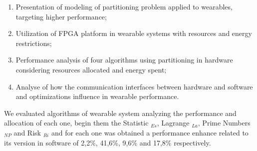     \begin{enumerate}
        \item 
        
        Presentation of modeling of partitioning problem applied to wearables, targeting higher performance;
        
        \item 
        Utilization of FPGA platform in wearable systems with resources and energy restrictions;
        
        
        \item %
        Performance analysis of four algorithms using partitioning in hardware considering resources allocated and energy spent;
        
        \item 
        Analyse of how the communication interfaces between hardware and software and optimizations influence in wearable performance.
        
    \end{enumerate}

    We evaluated algorithms of wearable system analyzing the performance and allocation of each one, begin them the Statistic \Ss$_{Es}$, Lagrange \Ss$_{La}$, Prime Numbers \Ss$_{NP}$ and Risk \Ss$_{Ri}$ and for each one was obtained a performance enhance related to its version in software of 2,2\%, 41,6\%, 9,6\% and 17,8\% respectively.
    

